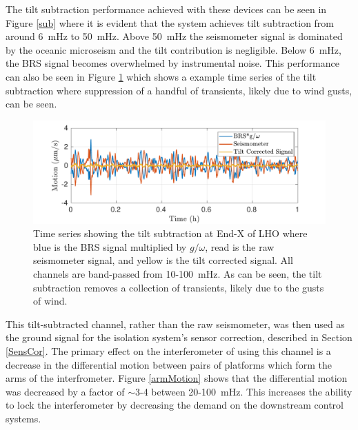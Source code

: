 \documentclass [12pt, proquest]{uwthesis}[2019]
\begin{document}
The tilt subtraction performance achieved with these devices can be seen in Figure \ref{sub} where it is evident that the system achieves tilt subtraction from around 6~mHz to 50~mHz. Above 50~mHz the seismometer signal is dominated by the oceanic microseism and the tilt contribution is negligible. Below 6~mHz, the BRS signal becomes overwhelmed by instrumental noise. This performance can also be seen in Figure \ref{subTime} which shows a example time series of the tilt subtraction where suppression of a handful of transients, likely due to wind gusts, can be seen.

\begin{figure}[!h]
\begin{center}
\includegraphics[width=\textwidth]{TiltCorrTime.pdf}
\caption[Time series showing tilt subtraction ]{Time series showing the tilt subtraction at End-X of LHO where blue is the BRS signal multiplied by $g/\omega$, read is the raw seismometer signal, and yellow is the tilt corrected signal. All channels are band-passed from 10-100~mHz. As can be seen, the tilt subtraction removes a collection of transients, likely due to the gusts of wind.}
\label{subTime}
\end{center}
\end{figure}

This tilt-subtracted channel, rather than the raw seismometer, was then used as the ground signal for the isolation system's sensor correction, described in Section \ref{SensCor}. The primary effect on the interferometer of using this channel is a decrease in the differential motion between pairs of platforms which form the arms of the interfrometer. Figure \ref{armMotion} shows that the differential motion was decreased by a factor of $\sim$3-4 between 20-100~mHz. This increases the ability to lock the interferometer by decreasing the demand on the downstream control systems.
\end{document}

